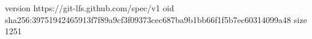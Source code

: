 version https://git-lfs.github.com/spec/v1
oid sha256:39751942465913f7f89a9cf3f09373cec687ba9b1bb66f1f5b7ec60314099a48
size 1251
